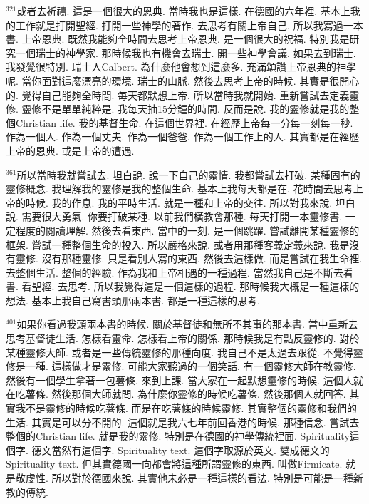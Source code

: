 \documentclass{book}
\begin{document}
$^{321}$或者去祈禱.
這是一個很大的恩典.
當時我也是這樣.
在德國的六年裡.
基本上我的工作就是打開聖經.
打開一些神學的著作.
去思考有關上帝自己.
所以我寫過一本書.
上帝恩典.
既然我能夠全時間去思考上帝恩典.
是一個很大的祝福.
特別我是研究一個瑞士的神學家.
那時候我也有機會去瑞士.
開一些神學會議.
如果去到瑞士.
我發覺很特別.
瑞士人Calbert.
為什麼他會想到這麼多.
充滿頌讚上帝恩典的神學呢.
當你面對這麼漂亮的環境.
瑞士的山脈.
然後去思考上帝的時候.
其實是很開心的.
覺得自己能夠全時間.
每天都默想上帝.
所以當時我就開始.
重新嘗試去定義靈修.
靈修不是單單純粹是.
我每天抽15分鐘的時間.
反而是說.
我的靈修就是我的整個Christian life.
我的基督生命.
在這個世界裡.
在經歷上帝每一分每一刻每一秒.
作為一個人.
作為一個丈夫.
作為一個爸爸.
作為一個工作上的人.
其實都是在經歷上帝的恩典.
或是上帝的遭遇.

$^{361}$所以當時我就嘗試去.
坦白說.
說一下自己的靈情.
我都嘗試去打破.
某種固有的靈修概念.
我理解我的靈修是我的整個生命.
基本上我每天都是在.
花時間去思考上帝的時候.
我的作息.
我的平時生活.
就是一種和上帝的交往.
所以對我來說.
坦白說.
需要很大勇氣.
你要打破某種.
以前我們橫教會那種.
每天打開一本靈修書.
一定程度的閱讀理解.
然後去看東西.
當中的一刻.
是一個跳躍.
嘗試離開某種靈修的框架.
嘗試一種整個生命的投入.
所以嚴格來說.
或者用那種客義定義來說.
我是沒有靈修.
沒有那種靈修.
只是看別人寫的東西.
然後去這樣做.
而是嘗試在我生命裡.
去整個生活.
整個的經驗.
作為我和上帝相遇的一種過程.
當然我自己是不斷去看書.
看聖經.
去思考.
所以我覺得這是一個這樣的過程.
那時候我大概是一種這樣的想法.
基本上我自己寫書頭那兩本書.
都是一種這樣的思考.

$^{401}$如果你看過我頭兩本書的時候.
關於基督徒和無所不其事的那本書.
當中重新去思考基督徒生活.
怎樣看靈命.
怎樣看上帝的關係.
那時候我是有點反靈修的.
對於某種靈修大師.
或者是一些傳統靈修的那種向度.
我自己不是太過去跟從.
不覺得靈修是一種.
這樣做才是靈修.
可能大家聽過的一個笑話.
有一個靈修大師在教靈修.
然後有一個學生拿著一包薯條.
來到上課.
當大家在一起默想靈修的時候.
這個人就在吃薯條.
然後那個大師就問.
為什麼你靈修的時候吃薯條.
然後那個人就回答.
其實我不是靈修的時候吃薯條.
而是在吃薯條的時候靈修.
其實整個的靈修和我們的生活.
其實是可以分不開的.
這個就是我六七年前回香港的時候.
那種信念.
嘗試去整個的Christian life.
就是我的靈修.
特別是在德國的神學傳統裡面.
Spirituality這個字.
德文當然有這個字.
Spirituality text.
這個字取源於英文.
變成德文的Spirituality text.
但其實德國一向都會將這種所謂靈修的東西.
叫做Firmicate.
就是敬虔性.
所以對於德國來說.
其實他未必是一種這樣的看法.
特別是可能是一種新教的傳統.
\end{document}

